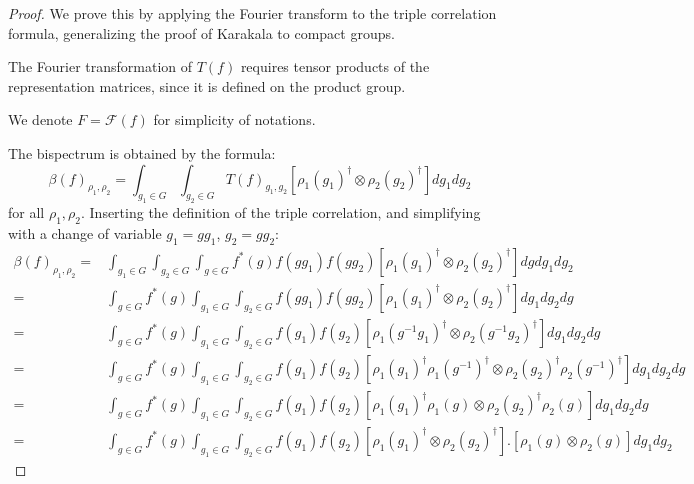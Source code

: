 \documentclass{article}
\begin{document}
\begin{proof}
We prove this by applying the Fourier transform to the triple correlation formula, generalizing the proof of Karakala to compact groups.

The Fourier transformation of $T(f)$ requires tensor products of the representation matrices, since it is defined on the product group.

We denote $F = \mathcal{F}(f)$ for simplicity of notations.

The bispectrum is obtained by the formula:
$$
\beta(f)_{\rho_1, \rho_2}
= \int_{g_1\in G} \int_{g_2\in G}
    T(f)_{g_1, g_2}
    \left[
        \rho_1\left(g_1\right)^{\dagger} \otimes \rho_2\left(g_2\right)^{\dagger}
    \right]dg_1dg_2
$$
for all ${\rho_1}, {\rho_2}$. Inserting the definition of the triple correlation, and simplifying with a change of variable $g_1 = gg_1$, $g_2 = gg_2$:
\begin{align*}
\beta(f)_{\rho_1, \rho_2}
=&
\int_{g_1\in G} \int_{g_2\in G}
    \int_{g \in G} f^*(g) f\left(g g_1\right) f\left(g g_2\right)
    \left[
        \rho_1\left(g_1\right)^{\dagger} \otimes \rho_2\left(g_2\right)^{\dagger}
    \right]
    dg dg_1dg_2 \\
=& \int_{g \in G}
    f^*(g)
    \int_{g_1\in G} \int_{g_2\in G}
    f\left(g g_1\right) f\left(g g_2\right)
    \left[
        \rho_1\left(g_1\right)^{\dagger} \otimes \rho_2\left(g_2\right)^{\dagger}
    \right]
    dg_1dg_2
    dg \\
=& \int_{g \in G}
    f^*(g)
    \int_{g_1\in G} \int_{g_2\in G}
    f\left(g_1\right) f\left(g_2\right)
    \left[
        \rho_1\left(g^{-1}g_1\right)^{\dagger} \otimes \rho_2\left(g^{-1}g_2\right)^{\dagger}
    \right]
    dg_1dg_2
    dg \\
=& \int_{g \in G}
    f^*(g)
    \int_{g_1\in G} \int_{g_2\in G}
    f\left(g_1\right) f\left(g_2\right)
    \left[
        \rho_1(g_1)^{\dagger}\rho_1(g^{-1})^{\dagger} \otimes \rho_2(g_2)^{\dagger}\rho_2(g^{-1})^\dagger
    \right]
    dg_1dg_2
    dg \\
=& \int_{g \in G}
    f^*(g)
    \int_{g_1\in G} \int_{g_2\in G}
    f\left(g_1\right) f\left(g_2\right)
    \left[
        \rho_1(g_1)^{\dagger}\rho_1(g) \otimes \rho_2(g_2)^{\dagger}\rho_2(g)
    \right]
    dg_1dg_2
    dg \\
=& \int_{g \in G}
    f^*(g)
    \int_{g_1\in G} \int_{g_2\in G}
    f\left(g_1\right) f\left(g_2\right)
        \left[\rho_1(g_1)^{\dagger}\otimes  \rho_2(g_2)^{\dagger}\right] . \left[\rho_1(g) \otimes \rho_2(g)\right]
    dg_1dg_2

\end{align*}
\end{proof}
\end{document}
